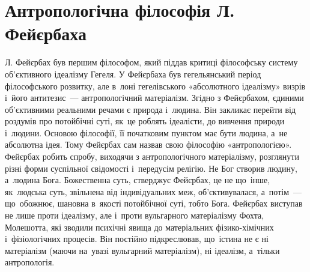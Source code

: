 \documentclass[a5paper,oneside,DIV=12,12pt,headings=small]{scrartcl}
\begin{document}
	\section{Антропологічна філософія Л. Фейєрбаха}
		Л. Фейєрбах був першим філософом, який піддав критиці філософську систему об'єктивного ідеалізму Гегеля. У Фейєрбаха був гегельянський період філософського розвитку, але в~лоні гегелівського «абсолютного ідеалізму» визрів і~його антитезис~— антропологічний матеріалізм. Згідно з Фейєрбахом, єдиними об'єктивними реальними речами є природа і~людина. Він закликає перейти від роздумів про потойбічні суті, як~це роблять ідеалісти, до вивчення природи і~людини. Основою філософії, її початковим пунктом має бути людина, а~не абсолютна ідея. Тому Фейєрбах сам назвав свою філософію «антропологією». Фейєрбах робить спробу, виходячи з антропологічного матеріалізму, розглянути різні форми суспільної свідомості і~передусім релігію. Не Бог створив людину, а~людина Бога. Божественна суть, стверджує Фейєрбах, це не що~інше, як~людська суть, звільнена від індивідуальних меж, об'єктивувалася, а~потім~— що~обожнює, шановна в~якості потойбічної суті, тобто Бога. Фейєрбах виступав не лише проти ідеалізму, але і~проти вульгарного матеріалізму Фохта, Молешотта, які зводили психічні явища до матеріальних фізико-хімічних і~фізіологічних процесів. Він постійно підкреслював, що~істина не є ні матеріалізм (маючи на~увазі вульгарний матеріалізм), ні ідеалізм, а~тільки антропологія.
		
\end{document}
